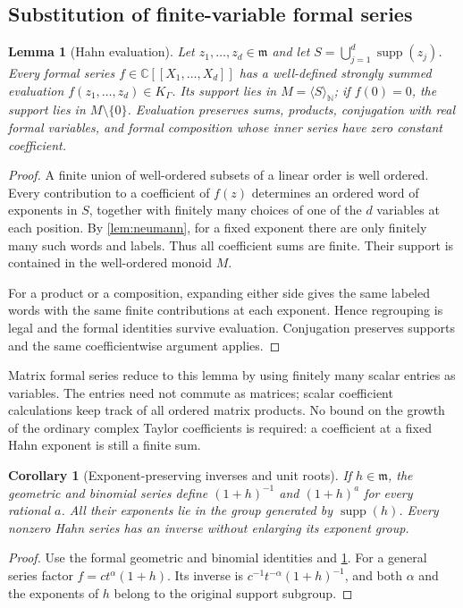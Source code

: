 \documentclass[11pt,letterpaper]{article}
\numberwithin{equation}{section}
\newtheorem{lemma}[theorem]{Lemma}
\newtheorem{corollary}[theorem]{Corollary}
\theoremstyle{definition}
\theoremstyle{remark}
\newcommand{\C}{\mathbb C}
\newcommand{\N}{\mathbb N}
\newcommand{\mm}{\mathfrak m}
\newcommand{\supp}{\operatorname{supp}}
\newcommand{\ang}[1]{\langle#1\rangle}
\newcommand{\KG}{K_{\Gamma}}
\begin{document}
\subsection{Substitution of finite-variable formal series}

\begin{lemma}[Hahn evaluation]\label{lem:evaluate}
Let $z_1,\ldots,z_d\in\mm$ and let
$S=\bigcup_{j=1}^d\supp(z_j)$. Every formal series
$f\in\C[[X_1,\ldots,X_d]]$ has a well-defined strongly summed evaluation
$f(z_1,\ldots,z_d)\in\KG$. Its support lies in
$M=\ang{S}_{\N}$; if $f(0)=0$, the support lies in $M\setminus\{0\}$.
Evaluation preserves sums, products, conjugation with real formal variables,
and formal composition whose inner series have zero constant coefficient.
\end{lemma}
\begin{proof}
A finite union of well-ordered subsets of a linear order is well ordered.
Every contribution to a coefficient of $f(z)$ determines an ordered word of
exponents in $S$, together with finitely many choices of one of the $d$
variables at each position. By \cref{lem:neumann}, for a fixed exponent there
are only finitely many such words and labels. Thus all coefficient sums are
finite. Their support is contained in the well-ordered monoid $M$.

For a product or a composition, expanding either side gives the same labeled
words with the same finite contributions at each exponent. Hence regrouping
is legal and the formal identities survive evaluation. Conjugation preserves
supports and the same coefficientwise argument applies.
\end{proof}

Matrix formal series reduce to this lemma by using finitely many scalar
entries as variables. The entries need not commute as matrices; scalar
coefficient calculations keep track of all ordered matrix products.
No bound on the growth of the ordinary complex Taylor coefficients is
required: a coefficient at a fixed Hahn exponent is still a finite sum.

\begin{corollary}[Exponent-preserving inverses and unit roots]\label{cor:unitroots}
If $h\in\mm$, the geometric and binomial series define
$(1+h)^{-1}$ and $(1+h)^a$ for every rational $a$. All their exponents lie in
the group generated by $\supp(h)$. Every nonzero Hahn series has an inverse
without enlarging its exponent group.
\end{corollary}
\begin{proof}
Use the formal geometric and binomial identities and \cref{lem:evaluate}.
For a general series factor $f=c t^\alpha(1+h)$. Its inverse is
$c^{-1}t^{-\alpha}(1+h)^{-1}$, and both $\alpha$ and the exponents of $h$
belong to the original support subgroup.
\end{proof}
\end{document}
